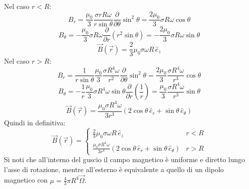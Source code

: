 Nel caso $ r < R $:
\begin{equation}
	B_r = \displaystyle\frac{\mu_0}{3} \displaystyle\frac{\sigma r R \omega}{r \sin\theta} \displaystyle\frac{\partial}{\partial\theta} \sin^2\theta = \displaystyle\frac{2\mu_0}{3} \sigma R \omega \cos\theta
	\label{eq:}
\end{equation}
\begin{equation}
	B_{\theta} = -\displaystyle\frac{\mu_0}{3} \sigma R \omega \displaystyle\frac{\partial}{\partial r} (r^2 \sin\theta) = -\displaystyle\frac{2\mu_0}{3} \sigma R \omega \sin\theta
	\label{eq:}
\end{equation}
\begin{equation}
	\vec{B}(\vec{r}) = \displaystyle\frac{2}{3} \mu_0 \sigma\omega R\,\hat{e}_z
	\label{eq:}
\end{equation}
Nel caso $ r > R $:
\begin{equation}
	B_r = \displaystyle\frac{1}{r \sin\theta} \displaystyle\frac{\mu_0}{3} \displaystyle\frac{\sigma R^4 \omega}{r^2} \displaystyle\frac{\partial}{\partial\theta} \sin^2\theta = \displaystyle\frac{2\mu_0}{3} \displaystyle\frac{\sigma R^4 \omega}{r^3} \cos\theta
	\label{eq:}
\end{equation}
\begin{equation}
	B_{\theta} = -\displaystyle\frac{1}{r} \displaystyle\frac{\mu_0}{3} \sigma R^4 \omega \sin\theta \displaystyle\frac{\partial}{\partial r} \left(\displaystyle\frac{1}{r}\right) = \displaystyle\frac{\mu_0}{3} \displaystyle\frac{\sigma R^4 \omega}{r^3} \sin\theta
	\label{eq:}
\end{equation}
\begin{equation}
	\vec{B}(\vec{r}) = \displaystyle\frac{\mu_0 \sigma R^4 \omega}{3 r^3} \left(2\cos\theta \,\hat{e}_r + \sin\theta \,\hat{e}_{\theta}\right)
	\label{eq:}
\end{equation}
Quindi in definitiva:
\begin{equation}
	\vec{B}(\vec{r}) =
	\begin{cases}
		\frac{2}{3} \mu_0 \sigma\omega R\,\hat{e}_z & r < R \\ 
		\displaystyle\frac{\mu_0 \sigma R^4 \omega}{3 r^3} \left(2\cos\theta \,\hat{e}_r + \sin\theta \,\hat{e}_{\theta}\right) & r > R
	\end{cases}
	\label{eq:mag-sf}
\end{equation}
Si noti che all'interno del guscio il campo magnetico è uniforme e diretto lungo l'asse di rotazione, mentre all'esterno è equivalente a quello di un dipolo magnetico con $ \mu = \frac{4}{3} \pi R^4 \vec{\Omega} $.
